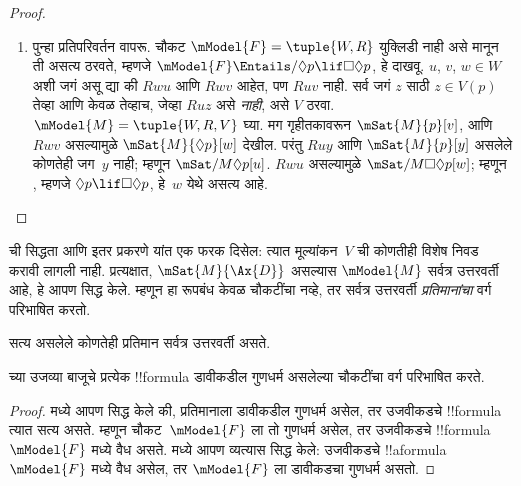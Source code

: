 \documentclass[../../../include/open-logic-section]{subfiles}
\begin{document}
\begin{proof}
\begin{enumerate}
    $z \in V(p)$ तेव्हा आणि केवळ तेव्हाच, जेव्हा
    $Ruz$, असे $V$ ठरवा (इतरत्र $V$ मनमाना आहे).
    $\mModel{M} =\tuple{W, R, V}$ घ्या. $V$ च्या
    व्याख्येनुसार $Ruz$ असलेल्या सर्व $z$ साठी
    $\mSat{M}{p}[z]$; म्हणून $\mSat{M}{\Box p}[u]$.
    गृहीतकावरून , म्हणजे $\Box p
    \lif \Box \Box p$, हे $u$ येथे सत्य आहे;
    म्हणून $\mSat{M}{\Box \Box
      p}[u]$. $Ruv$ आणि $Rvw$ असल्यामुळे
    $\mSat{M}{p}[w]$; पण $V$ च्या व्याख्येनुसार
    हे $Ruw$ असेल तेव्हाच शक्य आहे.
  \item पुन्हा प्रतिपरिवर्तन वापरू. चौकट
    $\mModel{F} = \tuple{W, R}$ युक्लिडी नाही असे
    मानून ती  असत्य ठरवते, म्हणजे
    $\mModel{F} \Entails/ \Diamond p \lif
      \Box\Diamond p$, हे दाखवू. $u$, $v$, $w \in W$
    अशी जगं असू द्या की $Rwu$ आणि $Rwv$ आहेत,
    पण $Ruv$ नाही. सर्व जगं $z$ साठी $z \in V(p)$
    तेव्हा आणि केवळ तेव्हाच, जेव्हा $Ruz$ असे
    \emph{नाही}, असे $V$ ठरवा. $\mModel{M}
    =\tuple{W, R, V}$ घ्या. मग गृहीतकावरून
    $\mSat{M}{p}[v]$, आणि $Rwv$ असल्यामुळे
    $\mSat{M}{\Diamond p}[w]$ देखील. परंतु
    $Ruy$ आणि $\mSat{M}{p}[y]$ असलेले कोणतेही
    जग~$y$ नाही; म्हणून $\mSat/{M}{\Diamond
      p}[u]$. $Rwu$ असल्यामुळे
    $\mSat/{M}{\Box\Diamond
      p}[w]$; म्हणून , म्हणजे
    $\Diamond p \lif \Box\Diamond p$, हे~$w$
    येथे असत्य आहे.
  \end{enumerate}
\end{proof}

 ची सिद्धता आणि इतर प्रकरणे यांत एक फरक दिसेल:
त्यात मूल्यांकन~$V$ ची कोणतीही विशेष निवड करावी लागली नाही. प्रत्यक्षात,
$\mSat{M}{\Ax{D}}$ असल्यास $\mModel{M}$ सर्वत्र
उत्तरवर्ती आहे, हे आपण सिद्ध केले. म्हणून 
हा रूपबंध केवळ चौकटींचा नव्हे, तर सर्वत्र उत्तरवर्ती
\emph{प्रतिमानांचा} वर्ग परिभाषित करतो.

\begin{cor}
   सत्य असलेले कोणतेही प्रतिमान सर्वत्र उत्तरवर्ती असते.
\end{cor}

\begin{cor}
 च्या उजव्या बाजूचे प्रत्येक
!!{formula} डावीकडील गुणधर्म असलेल्या चौकटींचा
वर्ग परिभाषित करते.
\end{cor}

\begin{proof}
   मध्ये आपण सिद्ध केले की,
  प्रतिमानाला डावीकडील गुणधर्म असेल, तर उजवीकडचे
  !!{formula} त्यात सत्य असते. म्हणून चौकट~$\mModel{F}$
  ला तो गुणधर्म असेल, तर उजवीकडचे !!{formula}
  $\mModel{F}$ मध्ये वैध असते.
   मध्ये आपण व्यत्यास
  सिद्ध केले: उजवीकडचे !!a{formula}~$\mModel{F}$
  मध्ये वैध असेल, तर $\mModel{F}$ ला डावीकडचा
  गुणधर्म असतो.
\end{proof}
\end{document}
